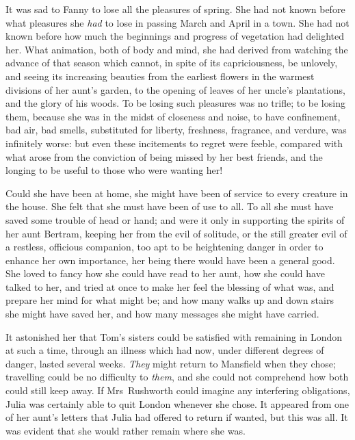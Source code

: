It was sad to Fanny to lose all the pleasures of spring. She had not known before what pleasures she \textit{had}  to lose in passing March and April in a town. She had not known before how much the beginnings and progress of vegetation had delighted her. What animation, both of body and mind, she had derived from watching the advance of that season which cannot, in spite of its capriciousness, be unlovely, and seeing its increasing beauties from the earliest flowers in the warmest divisions of her aunt's garden, to the opening of leaves of her uncle's plantations, and the glory of his woods. To be losing such pleasures was no trifle; to be losing them, because she was in the midst of closeness and noise, to have confinement, bad air, bad smells, substituted for liberty, freshness, fragrance, and verdure, was infinitely worse: but even these incitements to regret were feeble, compared with what arose from the conviction of being missed by her best friends, and the longing to be useful to those who were wanting her!

Could she have been at home, she might have been of service to every creature in the house. She felt that she must have been of use to all. To all she must have saved some trouble of head or hand; and were it only in supporting the spirits of her aunt Bertram, keeping her from the evil of solitude, or the still greater evil of a restless, officious companion, too apt to be heightening danger in order to enhance her own importance, her being there would have been a general good. She loved to fancy how she could have read to her aunt, how she could have talked to her, and tried at once to make her feel the blessing of what was, and prepare her mind for what might be; and how many walks up and down stairs she might have saved her, and how many messages she might have carried.

It astonished her that Tom's sisters could be satisfied with remaining in London at such a time, through an illness which had now, under different degrees of danger, lasted several weeks. \textit{They}  might return to Mansfield when they chose; travelling could be no difficulty to \textit{them}, and she could not comprehend how both could still keep away. If Mrs~Rushworth could imagine any interfering obligations, Julia was certainly able to quit London whenever she chose. It appeared from one of her aunt's letters that Julia had offered to return if wanted, but this was all. It was evident that she would rather remain where she was.

